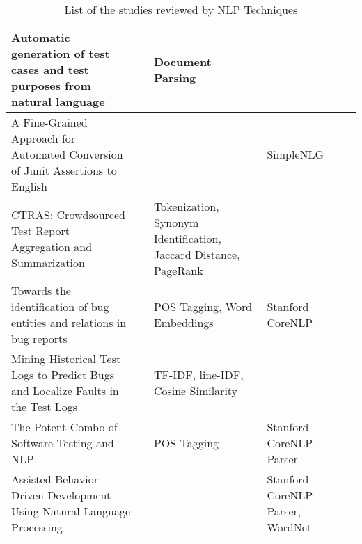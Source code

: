 \begin{appendices}
\begin{table}[H]
{\begin{tabular}{ |p{3cm}|p{3cm}|p{3cm}|p{3cm}|p{3cm}| }
            \hline Automatic generation of test cases and test purposes from natural language & \cite{nogueira2015automatic} & Document Parsing & \\
            \hline A Fine-Grained Approach for Automated Conversion of Junit Assertions to English  & \cite{10.1145/3283812.3283819} &   & SimpleNLG\\
            \hline CTRAS: Crowdsourced Test Report Aggregation and Summarization  & \cite{8811987} & Tokenization, Synonym Identification, Jaccard Distance, PageRank & \\
            \hline Towards the identification of bug entities and relations in bug reports & \cite{li2022towards} & POS Tagging, Word Embeddings & Stanford CoreNLP\\
            \hline Mining Historical Test Logs to Predict Bugs and Localize Faults in the Test Logs & \cite{8812113} & TF-IDF, line-IDF, Cosine Similarity & \\
            \hline The Potent Combo of Software Testing and NLP & \cite{mulla2020potent} & POS Tagging & Stanford CoreNLP Parser\\
            \hline Assisted Behavior Driven Development Using Natural Language Processing & \cite{soeken2012assisted} &  & Stanford CoreNLP Parser, WordNet\\
        \hline
    \end{tabular}%
    }
\caption*{List of the studies reviewed by NLP Techniques}
\end{table}


\end{appendices}